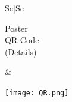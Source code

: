 \documentclass[a1paper,portrait,margin=0.8cm]{baposter}
\begin{document}
\begin{poster}
{\begin{minipage}[b]{0.5\textwidth}
\begin{tabular}{S{c}|S{c}}
\begin{minipage}[t]{0.5\textwidth}
\vspace{-0.1em}
\centering
\hspace{0.4em} Poster \\ 
\hspace{0.4em} QR Code \\
\hspace{0.4em} (Details)
\end{minipage}
&
\begin{minipage}[t]{0.4\textwidth}
\vspace{-1em}
\texttt{[image: QR.png]}
\end{minipage}

\end{tabular}

\end{minipage}
}



\end{poster}
\end{document}
